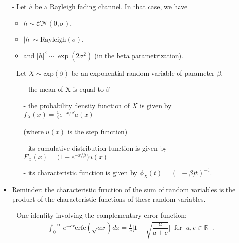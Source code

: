 \documentclass [a4paper, 11pt] {article}
\begin{document}
\begin{exercise}{1}
\begin{itemize}
    \item[-] Let $h$ be a Rayleigh fading channel. In that case, we have 
    \begin{itemize}
        \item $h \sim \mathcal{C}\mathcal{N}(0,\sigma)$,
        \item $|h| \sim \text{Rayleigh}(\sigma)$,
        \item and $|h|^2 \sim \exp(2\sigma^2)$ (in the beta parametrization). 
    \end{itemize}
    
    \item[-] Let $X \sim \text{exp}(\beta)$ be an exponential random variable of parameter $\beta$.
    
    \begin{itemize} 
    \item[-] the mean of X is equal to $\beta$
    \item[-] the probability density function of $X$ is given by $f_X(x) = \frac{1}{\beta}e^{-x/\beta}u(x)$  
    \item[] (where $u(x)$ is the step function)
    \item[-] its cumulative distribution function is given by $F_X(x) = \big(1 - e^{-x/\beta}\big)u(x)$
    \item[-] its characteristic function is given by $\phi_X(t) = (1-\beta jt)^{-1}$.
    \end{itemize}
    \item Reminder: the characteristic function of the sum of random variables is the product of the characteristic functions of these random variables.
    \item[-] One identity involving the complementary error function: 
    \begin{align}
    &\int^{+\infty}_{0}e^{-cx}\text{erfc}(\sqrt{ax}) dx = \frac{1}{c} \bigg[1-\sqrt{\dfrac{a}{a+c}}\bigg] \; \; \text{for} \; \; a,c \in \mathbb{R}^+.
    \end{align}

\end{itemize}
    \end{exercise}
    
\end{document}

